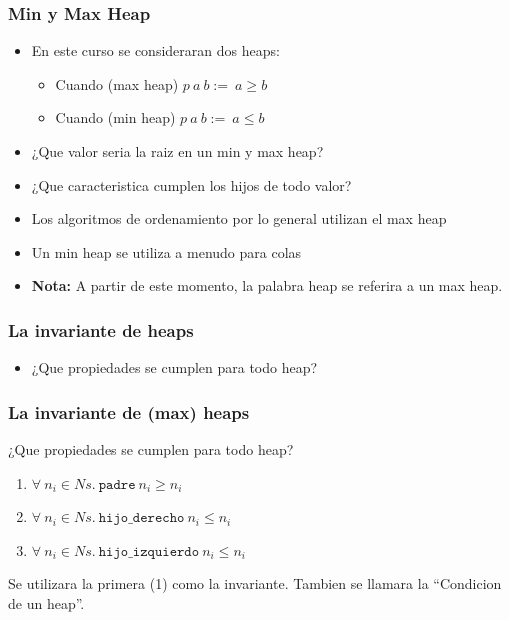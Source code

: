 \documentclass{beamer}
\begin{document}
\begin{frame}
    \frametitle{Min y Max Heap}
    \begin{itemize}
        \item{En este curso se consideraran dos heaps:
        \begin{itemize}
            \item{Cuando (max heap) $p\ a\ b:=\ a\geq b$}
            \item{Cuando (min heap) $p\ a\ b:=\ a\leq b$}
        \end{itemize}
        }
        \item{¿Que valor seria la raiz en un min y max heap?}
        \item{¿Que caracteristica cumplen los hijos de todo valor?}
        \item{Los algoritmos de ordenamiento por lo general utilizan el max heap}
        \item{Un min heap se utiliza a menudo para colas}
        \item{{\bf Nota:} A partir de este momento, la palabra heap se
        referira a un max heap.}
    \end{itemize}
\end{frame}

\begin{frame}
    \frametitle{La invariante de heaps}
    \begin{itemize}
        \item{¿Que propiedades se cumplen para todo heap?}

    \end{itemize}
\end{frame}

\begin{frame}
    \frametitle{La invariante de (max) heaps}
    \begin{itemize}
        \item{¿Que propiedades se cumplen para todo heap?
        \begin{enumerate}
            \item{$\forall\ n_i\in Ns.\ \mathtt{padre}\ n_i\geq n_i$}
            \item{$\forall\ n_i\in Ns.\ \mathtt{hijo\_derecho}\ n_i\leq n_i$}
            \item{$\forall\ n_i\in Ns.\ \mathtt{hijo\_izquierdo}\ n_i\leq n_i$}
        \end{enumerate}
        \item{Se utilizara la primera (1) como la invariante. Tambien se
        llamara la ``Condicion de un heap''.}
        }
    \end{itemize}
\end{frame}
\end{document}
